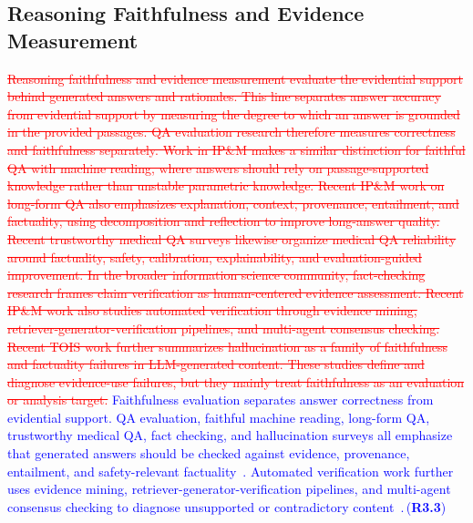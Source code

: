 \documentclass[a4paper,fleqn,doubleblind]{cas-sc}
\DeclareRobustCommand{\deleted}[1]{\textcolor{red}{\sout{#1}}}
\DeclareRobustCommand{\added}[1]{\textcolor{blue}{#1}}
\DeclareRobustCommand{\revtag}[1]{\textcolor{blue}{\scriptsize\,(\textbf{#1})}}
\begin{document}
\subsection{Reasoning Faithfulness and Evidence Measurement}
\deleted{Reasoning faithfulness and evidence measurement evaluate the evidential support behind generated answers and rationales. This line separates answer accuracy from evidential support by measuring the degree to which an answer is grounded in the provided passages. QA evaluation research therefore measures correctness and faithfulness separately. Work in IP\&M makes a similar distinction for faithful QA with machine reading, where answers should rely on passage-supported knowledge rather than unstable parametric knowledge. Recent IP\&M work on long-form QA also emphasizes explanation, context, provenance, entailment, and factuality, using decomposition and reflection to improve long-answer quality. Recent trustworthy medical QA surveys likewise organize medical QA reliability around factuality, safety, calibration, explainability, and evaluation-guided improvement. In the broader information science community, fact-checking research frames claim verification as human-centered evidence assessment. Recent IP\&M work also studies automated verification through evidence mining, retriever-generator-verification pipelines, and multi-agent consensus checking. Recent TOIS work further summarizes hallucination as a family of faithfulness and factuality failures in LLM-generated content. These studies define and diagnose evidence-use failures, but they mainly treat faithfulness as an evaluation or analysis target.}
\added{Faithfulness evaluation separates answer correctness from evidential support. QA evaluation, faithful machine reading, long-form QA, trustworthy medical QA, fact checking, and hallucination surveys all emphasize that generated answers should be checked against evidence, provenance, entailment, and safety-relevant factuality~\cite{adlakha2024evaluating, li2025mdmqa, xiao2025longformqa, wang2025trustworthy, das2023factchecking, huang2025surveyhallucination}. Automated verification work further uses evidence mining, retriever-generator-verification pipelines, and multi-agent consensus checking to diagnose unsupported or contradictory content~\cite{ipm2025rgv, ipm2025delphiagent}.}\revtag{R3.3}
\end{document}
